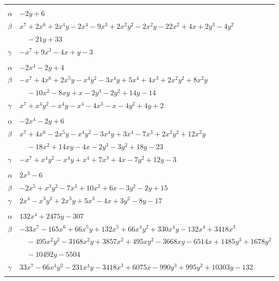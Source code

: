 \documentclass[11pt]{article}
\begin{document}
\begin{longtable}{@{}ll@{}}
\addlinespace[3pt]
\multicolumn{2}{@{}l}{$\{i,j\}=\{23,36\}$, $k_{ij}=2^{3}\cdot 3$}\\
$\alpha$ & $-2y+6$\\
$\beta$ & $x^{7}+2x^{6}+2x^{4}y-2x^{4}-9x^{3}+2x^{2}y^{2}-2x^{2}y-22x^{2}+4x+2y^{3}-4y^{2}$\\
 & $\quad -21y+33$\\
$\gamma$ & $-x^{7}+9x^{3}-4x+y-3$\\
\addlinespace[3pt]
\multicolumn{2}{@{}l}{$\{i,j\}=\{24,33\}$, $k_{ij}=2^{3}$}\\
$\alpha$ & $-2x^{4}-2y+4$\\
$\beta$ & $-x^{7}+4x^{6}+2x^{5}y-x^{4}y^{2}-3x^{4}y+5x^{4}+4x^{3}+2x^{2}y^{2}+8x^{2}y$\\
 & $\quad -10x^{2}-8xy+x-2y^{3}-2y^{2}+14y-14$\\
$\gamma$ & $x^{7}+x^{4}y^{2}-x^{4}y-x^{4}-4x^{3}-x-4y^{2}+4y+2$\\
\addlinespace[3pt]
\multicolumn{2}{@{}l}{$\{i,j\}=\{24,35\}$, $k_{ij}=2^{2}\cdot 5$}\\
$\alpha$ & $-2x^{4}-2y+6$\\
$\beta$ & $x^{7}+4x^{6}-2x^{5}y-x^{4}y^{2}-3x^{4}y+3x^{4}-7x^{3}+2x^{2}y^{2}+12x^{2}y$\\
 & $\quad -18x^{2}+14xy-4x-2y^{3}-3y^{2}+18y-23$\\
$\gamma$ & $-x^{7}+x^{4}y^{2}-x^{4}y+x^{4}+7x^{3}+4x-7y^{2}+12y-3$\\
\addlinespace[3pt]
\multicolumn{2}{@{}l}{$\{i,j\}=\{25,34\}$, $k_{ij}=2^{3}\cdot 5$}\\
$\alpha$ & $2x^{3}-6$\\
$\beta$ & $-2x^{5}+x^{3}y^{2}-7x^{3}+10x^{2}+6x-3y^{2}-2y+15$\\
$\gamma$ & $2x^{4}-x^{3}y^{2}+2x^{3}y+5x^{3}-4x+3y^{2}-8y-17$\\
\addlinespace[3pt]
\multicolumn{2}{@{}l}{$\{i,j\}=\{25,36\}$, $k_{ij}=5^{2}\cdot 7$}\\
$\alpha$ & $132x^{4}+2475y-307$\\
$\beta$ & $-33x^{7}-165x^{6}+66x^{5}y+132x^{5}+66x^{4}y^{2}+330x^{4}y-132x^{4}+3418x^{3}$\\
 & $\quad -495x^{2}y^{2}-3168x^{2}y+3857x^{2}+495xy^{2}-3668xy-6514x+1485y^{3}+1678y^{2}$\\
 & $\quad -10492y-5504$\\
$\gamma$ & $33x^{7}-66x^{4}y^{2}-231x^{4}y-3418x^{3}+6075x-990y^{3}+995y^{2}+10303y-132$\\
\addlinespace[3pt]
\multicolumn{2}{@{}l}{$\{i,j\}=\{26,28\}$, $k_{ij}=2^{4}\cdot 3$}\\

\end{longtable}
\end{document}
